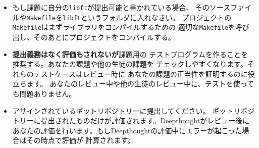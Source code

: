 \begin{itemize}
      \item もし課題に自分の\texttt{libft}が提出可能と書かれている場合、
        そのソースファイルや\texttt{Makefile}を\texttt{libft}というフォルダに入れなさい。
        プロジェクトの\texttt{Makefile}はまずライブラリをコンパイルするための
        適切な\texttt{Makefile}を呼び出し、そのあとにプロジェクトをコンパイルする。
      \item \textbf{提出義務はなく評価もされないが}課題用の
        テストプログラムを作ることを推奨する。あなたの課題や他の生徒の課題を
        チェックしやすくなります。それらのテストケースはレビュー時に
        あなたの課題の正当性を証明するのに役立ちます。
        あなたのレビュー中や他の生徒のレビュー中に、テストを使っても問題ありません。

      \item アサインされているギットリポジトリーに提出してください。
        ギットリポジトリーに提出されたものだけが評価されます。Deepthoughtがレビュー後に
        あなたの評価を行います。もしDeepthoughtの評価中にエラーが起こった場合はその時点で評価が
        計算されます。
    \end{itemize}
